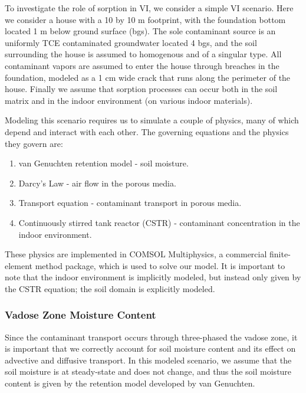 To investigate the role of sorption in VI, we consider a simple VI scenario.
Here we consider a house with a 10 by 10 m footprint, with the foundation bottom located 1 m below ground surface (bgs).
The sole contaminant source is an uniformly TCE contaminated groundwater located 4 bgs, and the soil surrounding the house is assumed to homogenous and of a singular type.
All contaminant vapors are assumed to enter the house through breaches in the foundation, modeled as a 1 cm wide crack that runs along the perimeter of the house.
Finally we assume that sorption processes can occur both in the soil matrix and in the indoor environment (on various indoor materials).\par

Modeling this scenario requires us to simulate a couple of physics, many of which depend and interact with each other.
The governing equations and the physics they govern are:
\begin{enumerate}
  \item van Genuchten retention model - soil moisture.
  \item Darcy's Law - air flow in the porous media.
  \item Transport equation - contaminant transport in porous media.
  \item Continuously stirred tank reactor (CSTR) - contaminant concentration in the indoor environment.
\end{enumerate}
These physics are implemented in COMSOL Multiphysics, a commercial finite-element method package, which is used to solve our model.
It is important to note that the indoor environment is implicitly modeled, but instead only given by the CSTR equation; the soil domain is explicitly modeled.\par

\subsubsection{Vadose Zone Moisture Content}

Since the contaminant transport occurs through three-phased the vadose zone, it is important that we correctly account for soil moisture content and its effect on advective and diffusive transport.
In this modeled scenario, we assume that the soil moisture is at steady-state and does not change, and thus the soil moisture content is given by the retention model developed by van Genuchten.\par


